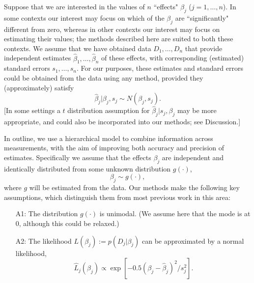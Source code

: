 \documentclass[10pt]{article}
\begin{document}
 Suppose that we are interested in the values of $n$ ``effects" $\beta_j$ ($j=1,\dots,n$). In some contexts our interest may focus on which of the $\beta_j$ are ``significantly" different from zero, whereas in other contexts our interest may focus on estimating their values; the methods described here are suited to both these contexts.
 We assume that we have obtained data $D_1,\dots,D_n$ that provide independent estimates $\hat\beta_1,\dots,\hat\beta_n$ of these effects,
 with corresponding (estimated) standard errors $s_1,\dots,s_n$. For our purposes, these estimates and standard errors could be obtained from the data
 using any method, provided they (approximately) satisfy 
 \begin{equation} \label{eqn:betahat}
 \hat\beta_j | \beta_j, s_j \sim N(\beta_j, s_j).
 \end{equation}
 [In some settings a $t$ distribution assumption for $\hat\beta_j | s_j, \beta_j$ may be more appropriate, and could also be incorporated into our methods; see Discussion.]
 
 In outline, we use a hierarchical model to combine information across measurements, with the aim of improving both accuracy and precision of estimates. 
 Specifically we assume that the effects $\beta_j$ are independent and identically distributed from some unknown distribution $g(\cdot)$,
 \begin{equation} \label{eqn:beta}
 \beta_j \sim g(\cdot),
 \end{equation}
 where $g$ will be estimated from
 the data.  Our methods make the following key assumptions, which distinguish them from most previous work in this area:
   \begin{enumerate}
  \item[A1:] The distribution $g(\cdot)$ is unimodal. (We assume here that the mode is at 0, although 
this could be relaxed.)  
 \item[A2:] The likelihood $L(\beta_j) := p(D_j | \beta_j)$ can be approximated by a normal likelihood,
 \begin{equation} \label{eqn:lik}
 \hat{L}_j(\beta_j) \propto \exp[-0.5(\beta_j-\hat\beta_j)^2/s_j^2].
 \end{equation}
 \end{enumerate}
 
\end{document}
